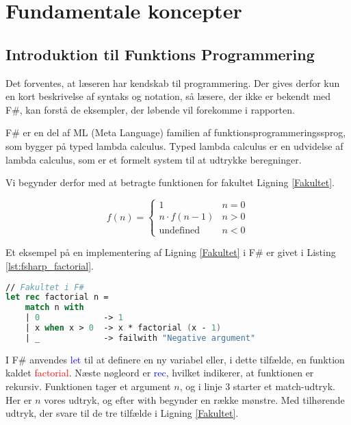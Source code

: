 
\section{Fundamentale koncepter}
\subsection{Introduktion til Funktions Programmering}
Det forventes, at læseren har kendskab til programmering. Der gives derfor kun en kort beskrivelse af syntaks og notation, så læsere, der ikke er bekendt med F\#, kan forstå de eksempler, der løbende vil forekomme i rapporten. 

F\# er en del af ML (Meta Language) familien af funktionsprogrammeringssprog, som bygger på typed lambda calculus. Typed lambda calculus er en udvidelse af lambda calculus, som er et formelt system til at udtrykke beregninger.


Vi begynder derfor med at betragte funktionen for fakultet Ligning \eqref{Fakultet}.

\begin{equation}
    \label{Fakultet}
    f(n) = \begin{cases} 
            1 &  n = 0  \\
            n \cdot f(n-1) & n > 0 \\
            \text{undefined} & n < 0 
           \end{cases}
\end{equation}

Et eksempel på en implementering af Ligning \eqref{Fakultet} i F\# er givet i Listing \ref{lst:fsharp_factorial}.

\begin{lstlisting}[language={FSharp}, label={lst:fsharp_factorial}, caption={Eksempel på Fakultet i F\#}]
// Fakultet i F#
let rec factorial n =
    match n with
    | 0             -> 1 
    | x when x > 0  -> x * factorial (x - 1)
    | _             -> failwith "Negative argument"
\end{lstlisting}

I F\# anvendes \textcolor{blue}{let} til at definere en ny variabel eller, i dette tilfælde, en funktion kaldet \textcolor{red}{factorial}. Næste nøgleord er \textcolor{blue}{rec}, hvilket indikerer, at funktionen er rekursiv. Funktionen tager et argument \(n\), og i linje 3 starter et match-udtryk. Her er \(n\) vores udtryk, og efter \textcolor{codepurple}{with} begynder en række mønstre. Med tilhørende udtryk, der svare til de tre tilfælde i Ligning \eqref{Fakultet}. 
    
